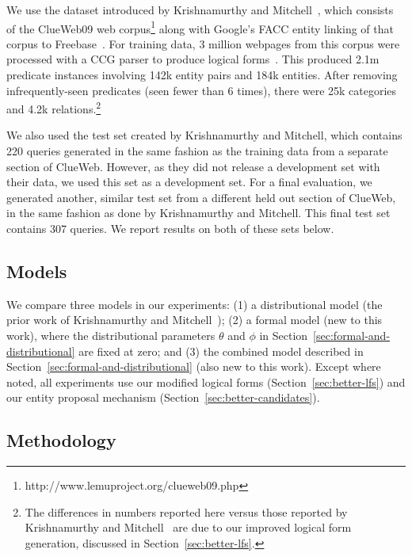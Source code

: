 \documentclass[11pt]{article}
\newcommand{\secref}[1]{Section~\ref{sec:#1}}
\begin{document}
We use the dataset introduced by Krishnamurthy and
Mitchell~,
which consists of the ClueWeb09 web
corpus\footnote{http://www.lemuproject.org/clueweb09.php} along with
Google's FACC entity linking of that corpus to
Freebase~\cite{gabrilovich-2013-clueweb-entity-linking}.  For training
data, 3 million webpages from this corpus were processed with a CCG
parser to produce logical forms~\cite{krishnamurthy-2014-joint-ccg}.
This produced 2.1m predicate instances involving 142k entity pairs and
184k entities.  After removing infrequently-seen predicates (seen
fewer than 6 times), there were 25k categories and 4.2k
relations.\footnote{The differences in numbers reported here versus
those reported by Krishnamurthy and
Mitchell~ are
due to our improved logical form generation, discussed in
\secref{better-lfs}.}

We also used the test set created by Krishnamurthy and Mitchell, which
contains 220 queries generated in the same fashion as the training
data from a separate section of ClueWeb.  However, as they did not
release a development set with their data, we used this set as a
development set.  For a final evaluation, we generated another,
similar test set from a different held out section of ClueWeb, in the
same fashion as done by Krishnamurthy and Mitchell.  This final test
set contains 307 queries.  We report results on both of these sets
below.

\subsection{Models}

We compare three models in our experiments: (1) a distributional model
(the prior work of Krishnamurthy and
Mitchell~); (2)
a formal model (new to this work), where the distributional parameters
$\theta$ and $\phi$ in \secref{formal-and-distributional} are fixed at
zero; and (3) the combined model described in
\secref{formal-and-distributional} (also new to this work).  Except
where noted, all experiments use our modified logical forms
(\secref{better-lfs}) and our entity proposal mechanism
(\secref{better-candidates}).

\subsection{Methodology}
\end{document}

